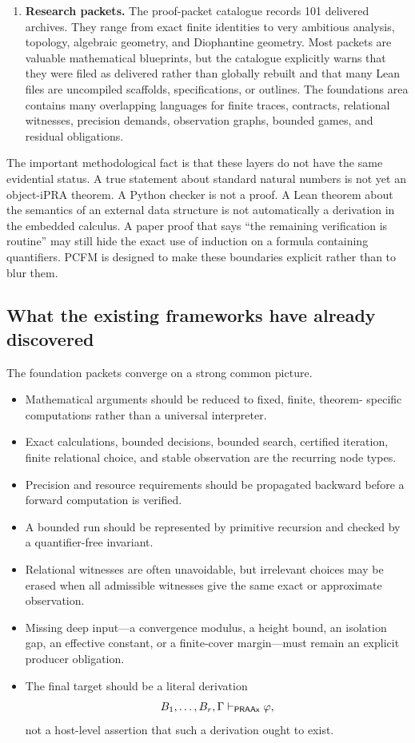 \begin{enumerate}
\item
\textbf{Research packets.}
The proof-packet catalogue records 101 delivered archives.  They range from
exact finite identities to very ambitious analysis, topology, algebraic
geometry, and Diophantine geometry.  Most packets are valuable mathematical
blueprints, but the catalogue explicitly warns that they were filed as
delivered rather than globally rebuilt and that many Lean files are
uncompiled scaffolds, specifications, or outlines.  The foundations area
contains many overlapping languages for finite traces, contracts, relational
witnesses, precision demands, observation graphs, bounded games, and residual
obligations.
\end{enumerate}

The important methodological fact is that these layers do not have the same
evidential status.  A true statement about standard natural numbers is not yet
an object-iPRA theorem.  A Python checker is not a  proof.  A
Lean theorem about the semantics of an external data structure is not
automatically a derivation in the embedded calculus.  A paper proof that says
``the remaining verification is routine'' may still hide the exact use of
induction on a formula containing quantifiers.  PCFM is designed to make these
boundaries explicit rather than to blur them.

\subsection{What the existing frameworks have already discovered}

The foundation packets converge on a strong common picture.

\begin{itemize}
\item Mathematical arguments should be reduced to fixed, finite, theorem-
specific computations rather than a universal interpreter.
\item Exact calculations, bounded decisions, bounded search, certified
iteration, finite relational choice, and stable observation are the recurring
node types.
\item Precision and resource requirements should be propagated backward before
a forward computation is verified.
\item A bounded run should be represented by primitive recursion and checked by
a quantifier-free invariant.
\item Relational witnesses are often unavoidable, but irrelevant choices may be
erased when all admissible witnesses give the same exact or approximate
observation.
\item Missing deep input---a convergence modulus, a height bound, an isolation
gap, an effective constant, or a finite-cover margin---must remain an explicit
producer obligation.
\item The final target should be a literal derivation
\[
      B_1,\ldots,B_r,\Gamma\vdash_{\mathsf{PRAAx}}\varphi ,
\]
not a host-level assertion that such a derivation ought to exist.
\end{itemize}

